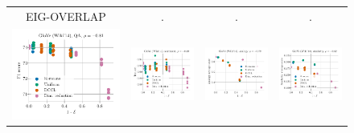 \begin{figure}
	\centering
	\begin{tabular}{@{\hskip -0.0in}c@{\hskip -0.0in}c@{\hskip -0.0in}c@{\hskip -0.0in}c@{\hskip -0.0in}}
		EIG-OVERLAP & . & . & . \\
		\includegraphics[width=.245\linewidth]{figures/glove400k_qa_best-f1_vs_subspace-eig-overlap_linx.pdf} &
		\includegraphics[width=.245\linewidth]{figures/glove400k_sentiment_trec_test-acc_vs_subspace-eig-overlap_linx.pdf} &
		\includegraphics[width=.245\linewidth]{figures/glove400k_intrinsics_analogy-avg-score_vs_subspace-eig-overlap_linx.pdf} &
		\includegraphics[width=.245\linewidth]{figures/glove400k_intrinsics_similarity-avg-score_vs_subspace-eig-overlap_linx.pdf} \\
		

\end{tabular}
\end{figure}
